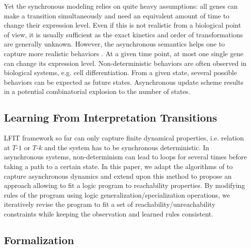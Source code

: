 Yet the synchronous modeling relies on quite heavy assumptions:
all genes can make a transition simultaneously and need an equivalent amount of time to change their expression level.
Even if this is not realistic from a biological point of view, it is usually sufficient as the exact kinetics and order of transformations are generally unknown.
However, the asynchronous semantics helps one to capture more realistic behaviors \cite{bernot2009}.
At a given time point, at most one single gene can change its expression level.
Non-deterministic behaviors are often observed in biological systems, e.g. cell differentiation.
From a given state, several possible behaviors can be expected as future states.
Asynchronous update scheme results in a potential combinatorial explosion to the number of states.


\subsection{Learning From Interpretation Transitions}\label{sec:lfit}
LFIT framework so far can only capture finite dynamical properties, i.e. relation at $T$-$1$ or $T$-$k$ and the system has to be synchronous deterministic.
In asynchronous systems, non-determinism can lead to loops for several times before taking a path to a certain state.
In this paper, we adapt the algorithms of \cite{ribeiro2015learning,DMTRICLP15} to capture asynchronous dynamics and extend upon this method to propose an approach allowing to fit a logic program to reachability properties.
By modifying rules of the program using logic generalization/specialization operations, we iteratively revise the program to fit a set of reachability/unreachability constraints while keeping the observation and learned rules consistent.
\subsection{Formalization}
    
